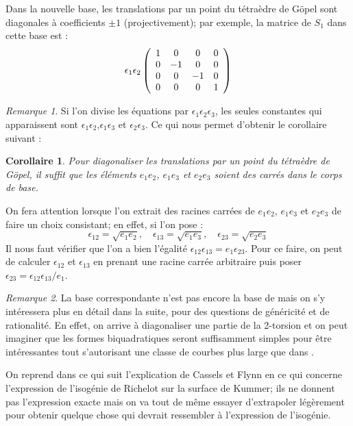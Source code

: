 \documentclass[a4paper,12pt]{article}
\newtheorem{corollaire}[theoreme]{Corollaire}
\theoremstyle{definition}
\theoremstyle{remark}
\newtheorem{remarque}{Remarque}
\numberwithin{equation}{section}
\begin{document}
Dans la nouvelle base, les translations par un point du tétraèdre de G\"opel sont diagonales à coefficients $\pm 1$ (projectivement); par exemple, la matrice de $S_1$ dans cette base est :
\[ \epsilon_1\epsilon_2
\left(
  \begin{array}{ c c c c}
     1 & 0 & 0  & 0  \\
     0 & -1   & 0  & 0  \\
     0 & 0   & -1  & 0 \\
     0 & 0   & 0  & 1  \\
  \end{array} \right)
\]

\begin{remarque}
Si l'on divise les équations par $\epsilon_1\epsilon_2\epsilon_3$, les seules constantes qui apparaissent sont $\epsilon_1\epsilon_2$,$\epsilon_1\epsilon_3$ et $\epsilon_2\epsilon_3$. Ce qui nous permet d'obtenir le corollaire suivant :
\end{remarque}

\begin{corollaire}
Pour diagonaliser les translations par un point du tétraèdre de G\"opel, il suffit que les éléments $e_1e_2$, $e_1e_3$ et $e_2e_3$ soient des carrés dans le corps de base.
\end{corollaire}

On fera attention lorsque l'on extrait des racines carrées de $e_1e_2$, $e_1e_3$ et $e_2e_3$ de faire un choix consistant; en effet, si l'on pose :
$$\epsilon_{12} = \sqrt{e_1e_2}, \quad \epsilon_{13} = \sqrt{e_1e_3}, \quad \epsilon_{23} = \sqrt{e_2e_3}$$
Il nous faut vérifier que l'on a bien l'égalité $\epsilon_{12}\epsilon_{13} = e_1\epsilon_{23}$.
Pour ce faire, on peut de calculer $\epsilon_{12}$ et $\epsilon_{13}$ en prenant une racine carrée arbitraire puis poser $\epsilon_{23} = \epsilon_{12}\epsilon_{13}/e_1$.

\begin{remarque}
La base correspondante n'est pas encore la base de \citep{gaudry} mais on s'y intéressera plus en détail dans la suite, pour des questions de généricité et de rationalité. En effet, on arrive à diagonaliser une partie de la 2-torsion et on peut imaginer que les formes biquadratiques seront suffisamment simples pour être intéressantes tout s'autorisant une classe de courbes plus large que dans \citep{gaudry}.
\end{remarque}

On reprend dans ce qui suit l'explication de Cassels et Flynn en ce qui concerne l'expression de l'isogénie de Richelot sur la surface de Kummer; ils ne donnent pas l'expression exacte mais on va tout de même essayer d'extrapoler légèrement pour obtenir quelque chose qui devrait ressembler à l'expression de l'isogénie.
\end{document}
